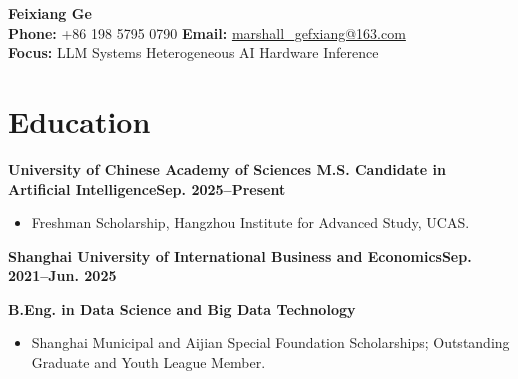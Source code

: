 \documentclass[10pt,a4paper]{article}
\newcommand{\dates}[1]{\hfill\textbf{#1}}
\newcommand{\role}[1]{{\bfseries\fontsize{11pt}{13pt}\selectfont #1}}
\begin{document}
\begin{center}
    {\Huge\bfseries\color{accent} Feixiang Ge}\\[0.55em]
    \textbf{Phone:} +86 198 5795 0790\hspace{1.5em}
    \textbf{Email:} \href{mailto:marshall_gefxiang@163.com}{marshall\_gefxiang@163.com}\\[0.35em]
    \textbf{Focus:} LLM Systems \textbar{} Heterogeneous AI Hardware Inference
\end{center}

\section*{Education}
\role{University of Chinese Academy of Sciences \textbar{} M.S. Candidate in Artificial Intelligence}\dates{Sep. 2025--Present}
\begin{itemize}
    \item Freshman Scholarship, Hangzhou Institute for Advanced Study, UCAS.
\end{itemize}

\role{Shanghai University of International Business and Economics}\dates{Sep. 2021--Jun. 2025}
\par\textbf{B.Eng. in Data Science and Big Data Technology}
\begin{itemize}
    \item Shanghai Municipal and Aijian Special Foundation Scholarships; Outstanding Graduate and Youth League Member.
\end{itemize}
\end{document}

